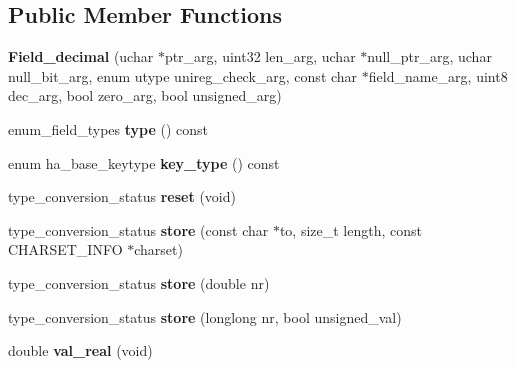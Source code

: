 \subsection*{Public Member Functions}
\begin{DoxyCompactItemize}
\item 
\mbox{\label{classField__decimal_a6a05ff20ee0bfd940e01296411e1a032}} 
{\bfseries Field\+\_\+decimal} (uchar $\ast$ptr\+\_\+arg, uint32 len\+\_\+arg, uchar $\ast$null\+\_\+ptr\+\_\+arg, uchar null\+\_\+bit\+\_\+arg, enum utype unireg\+\_\+check\+\_\+arg, const char $\ast$field\+\_\+name\+\_\+arg, uint8 dec\+\_\+arg, bool zero\+\_\+arg, bool unsigned\+\_\+arg)
\item 
\mbox{\label{classField__decimal_ad5f3ee7b207b97f89d9eae7f278e9416}} 
enum\+\_\+field\+\_\+types {\bfseries type} () const
\item 
\mbox{\label{classField__decimal_a9c6bee9da23e9d642cd1636069318ab9}} 
enum ha\+\_\+base\+\_\+keytype {\bfseries key\+\_\+type} () const
\item 
\mbox{\label{classField__decimal_a0beda60c893f29aa43f0143990a360cd}} 
type\+\_\+conversion\+\_\+status {\bfseries reset} (void)
\item 
\mbox{\label{classField__decimal_a80f53834d46376e108c4812b736c2cb1}} 
type\+\_\+conversion\+\_\+status {\bfseries store} (const char $\ast$to, size\+\_\+t length, const C\+H\+A\+R\+S\+E\+T\+\_\+\+I\+N\+FO $\ast$charset)
\item 
\mbox{\label{classField__decimal_ab5974b7859b7325cbe4d594378b39d94}} 
type\+\_\+conversion\+\_\+status {\bfseries store} (double nr)
\item 
\mbox{\label{classField__decimal_affdbaf82f11639e06b9fab6ad2c65147}} 
type\+\_\+conversion\+\_\+status {\bfseries store} (longlong nr, bool unsigned\+\_\+val)
\item 
\mbox{\label{classField__decimal_ae4d41a764c6b25d3f22f2f053f81a7d2}} 
double {\bfseries val\+\_\+real} (void)
\item 
\mbox{\label{classField__decimal_a8568104c2c398992cab90ed3272bf5d3}} 

\end{DoxyCompactItemize}
